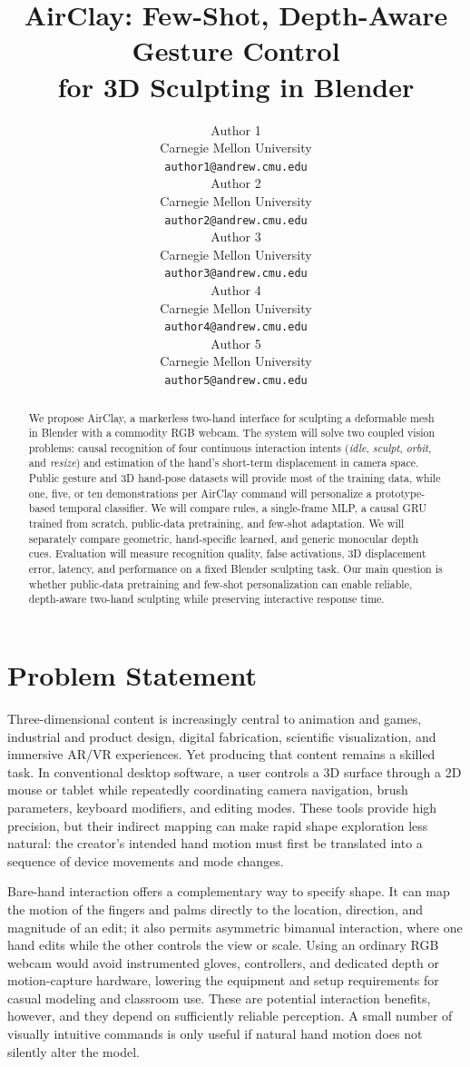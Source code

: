 \documentclass{article}
\title{AirClay: Few-Shot, Depth-Aware Gesture Control\\
for 3D Sculpting in Blender}
\author{%
  Author 1 \\
  Carnegie Mellon University \\
  \texttt{author1@andrew.cmu.edu} \\
  \And
  Author 2 \\
  Carnegie Mellon University \\
  \texttt{author2@andrew.cmu.edu} \\
  \And
  Author 3 \\
  Carnegie Mellon University \\
  \texttt{author3@andrew.cmu.edu} \\
  \AND
  Author 4 \\
  Carnegie Mellon University \\
  \texttt{author4@andrew.cmu.edu} \\
  \And
  Author 5 \\
  Carnegie Mellon University \\
  \texttt{author5@andrew.cmu.edu} \\
}
\begin{document}
\maketitle

\begin{abstract}
We propose AirClay, a markerless two-hand interface for sculpting a deformable
mesh in Blender with a commodity RGB webcam. The system will solve two coupled
vision problems: causal recognition of four continuous interaction intents
(\textit{idle}, \textit{sculpt}, \textit{orbit}, and \textit{resize}) and
estimation of the hand's short-term displacement in camera space. Public
gesture and 3D hand-pose datasets will provide most of the training data, while
one, five, or ten demonstrations per AirClay command will personalize a
prototype-based temporal classifier. We will compare rules, a single-frame
MLP, a causal GRU trained from scratch, public-data pretraining, and few-shot
adaptation. We will separately compare geometric, hand-specific learned, and
generic monocular depth cues. Evaluation will measure recognition quality,
false activations, 3D displacement error, latency, and performance on a fixed
Blender sculpting task. Our main question is whether public-data pretraining
and few-shot personalization can enable reliable, depth-aware two-hand
sculpting while preserving interactive response time.
\end{abstract}

\section{Problem Statement}

Three-dimensional content is increasingly central to animation and games,
industrial and product design, digital fabrication, scientific visualization,
and immersive AR/VR experiences. Yet producing that content remains a skilled
task. In conventional desktop software, a user controls a 3D surface through a
2D mouse or tablet while repeatedly coordinating camera navigation, brush
parameters, keyboard modifiers, and editing modes. These tools provide high
precision, but their indirect mapping can make rapid shape exploration less
natural: the creator's intended hand motion must first be translated into a
sequence of device movements and mode changes.

Bare-hand interaction offers a complementary way to specify shape. It can map
the motion of the fingers and palms directly to the location, direction, and
magnitude of an edit; it also permits asymmetric bimanual interaction, where
one hand edits while the other controls the view or scale. Using an ordinary
RGB webcam would avoid instrumented gloves, controllers, and dedicated depth or
motion-capture hardware, lowering the equipment and setup requirements for
casual modeling and classroom use. These are potential interaction benefits,
however, and they depend on sufficiently reliable perception. A small number
of visually intuitive commands is only useful if natural hand motion does not
silently alter the model.
\end{document}
